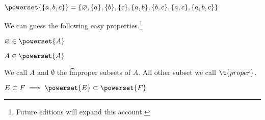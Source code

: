 \begin{proposition}
  $\powerset{\set{a, b, c}} =
  \{
    \emptyset,
    \set{a},
    \set{b},
    \set{c},
    \set{a, b},
    \set{b, c},
    \set{a, c},
    \set{a, b, c}
  \}$
\end{proposition}


We can guess the following easy properties.\footnote{Future editions will expand this account.}

\begin{proposition}
  $\emptyset \in \powerset{A}$
\end{proposition}

\begin{proposition}
  $A \in \powerset{A}$
\end{proposition}

We call $A$ and $\emptyset$ the \t{improper} subsets of $A$.
All other subset we call $\t{proper}$.


\begin{proposition}
  $E \subset F \implies \powerset{E} \subset \powerset{F}$
\end{proposition}

